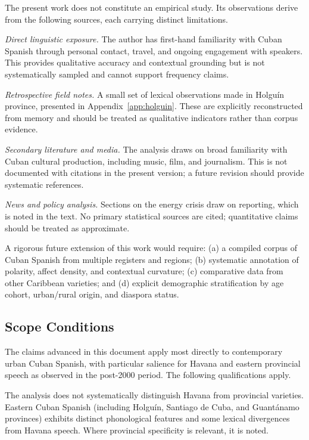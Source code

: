 \documentclass[12pt]{article}
\begin{document}
The present work does not constitute an empirical study. Its observations derive from the following sources, each carrying distinct limitations.

\textit{Direct linguistic exposure.} The author has first-hand familiarity with Cuban Spanish through personal contact, travel, and ongoing engagement with speakers. This provides qualitative accuracy and contextual grounding but is not systematically sampled and cannot support frequency claims.

\textit{Retrospective field notes.} A small set of lexical observations made in Holguín province, presented in Appendix~\ref{app:holguin}. These are explicitly reconstructed from memory and should be treated as qualitative indicators rather than corpus evidence.

\textit{Secondary literature and media.} The analysis draws on broad familiarity with Cuban cultural production, including music, film, and journalism. This is not documented with citations in the present version; a future revision should provide systematic references.

\textit{News and policy analysis.} Sections on the energy crisis draw on reporting, which is noted in the text. No primary statistical sources are cited; quantitative claims should be treated as approximate.

A rigorous future extension of this work would require: (a) a compiled corpus of Cuban Spanish from multiple registers and regions; (b) systematic annotation of polarity, affect density, and contextual curvature; (c) comparative data from other Caribbean varieties; and (d) explicit demographic stratification by age cohort, urban/rural origin, and diaspora status.

\subsection*{Scope Conditions}

The claims advanced in this document apply most directly to contemporary urban Cuban Spanish, with particular salience for Havana and eastern provincial speech as observed in the post-2000 period. The following qualifications apply.

The analysis does not systematically distinguish Havana from provincial varieties. Eastern Cuban Spanish (including Holguín, Santiago de Cuba, and Guantánamo provinces) exhibits distinct phonological features and some lexical divergences from Havana speech. Where provincial specificity is relevant, it is noted.
\end{document}
